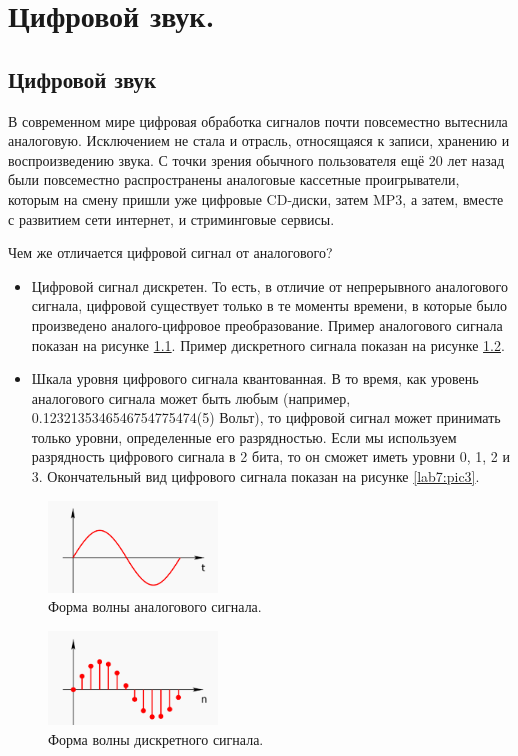 \chapter{Цифровой звук.}

\section{Цифровой звук}

В современном мире цифровая обработка сигналов почти повсеместно вытеснила аналоговую. Исключением не стала и отрасль, относящаяся к записи, хранению и воспроизведению звука. С точки зрения обычного пользователя ещё 20 лет назад были повсеместно распространены аналоговые кассетные проигрыватели, которым на смену пришли уже цифровые CD-диски, затем MP3, а затем, вместе с развитием сети интернет, и стриминговые сервисы.


Чем же отличается цифровой сигнал от аналогового?
\begin{itemize}
	\item Цифровой сигнал дискретен. То есть, в отличие от непрерывного аналогового сигнала, цифровой существует только в те моменты времени, в которые было произведено аналого-цифровое преобразование. Пример аналогового сигнала показан на рисунке \ref{lab7:pic1}. Пример дискретного сигнала показан на рисунке \ref{lab7:pic2}. 
	\item Шкала уровня цифрового сигнала квантованная. В то время, как уровень аналогового сигнала может быть любым (например, 0.1232135346546754775474(5) Вольт), то цифровой сигнал может принимать только уровни, определенные его разрядностью. Если мы используем разрядность цифрового сигнала в 2 бита, то он сможет иметь уровни 0, 1, 2 и 3. Окончательный вид цифрового сигнала показан на рисунке \ref{lab7:pic3}.
\end{itemize}



\begin{figure}[H]
	\centering
	\includegraphics [width=0.4\textwidth] {images/lab_7/analog.png}
	\caption{Форма волны аналогового сигнала.}
	\label{lab7:pic1}
\end{figure}


\begin{figure}[H]
	\centering
	\includegraphics [width=0.4\textwidth] {images/lab_7/discrete.png}
	\caption{Форма волны дискретного сигнала.}
	\label{lab7:pic2}
\end{figure}


